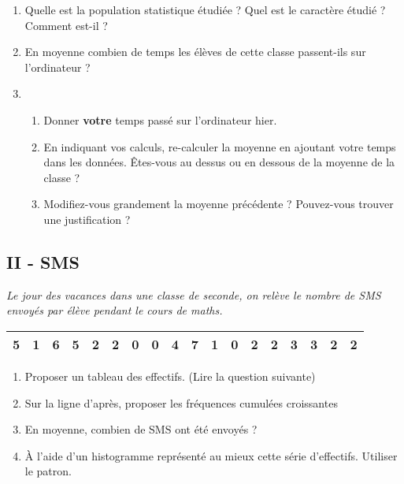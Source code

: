 \documentclass[11pt]{article}
\begin{document}
\begin{multicols}{2}
  \begin{enumerate}
  \item[1.] Quelle est la population statistique étudiée ? Quel est le caractère étudié ? Comment est-il ?
  \item[2.] En moyenne combien de temps les élèves de cette classe passent-ils sur l'ordinateur ?
  \item[3.]
    \begin{enumerate}
    \item[a)] Donner \textbf{votre} temps passé sur l'ordinateur hier.
    \item[b)] En indiquant vos calculs, re-calculer la moyenne en ajoutant votre temps dans les données. Êtes-vous au dessus ou en dessous de la moyenne de la classe ?
    \item[c)] Modifiez-vous grandement la moyenne précédente ? Pouvez-vous trouver une justification ?
    \end{enumerate}
  \end{enumerate}
\end{multicols}

\subsection*{II - SMS}

\textit{Le jour des vacances dans une classe de seconde, on relève le nombre de SMS envoyés par élève pendant le cours de maths.}

\begin{center}
  \begin{tabular}{| c | c | c | c | c | c | c | c | c | c | c | c | c | c | c | c | c | c | }
    \hline
    5 & 1 & 6 & 5 & 2 & 2 & 0 & 0 & 4 & 7 & 1 & 0 & 2 & 2 & 3 & 3 & 2 & 2 \\
    \hline
  \end{tabular}
\end{center}

\begin{multicols}{2}
  \begin{enumerate}
  \item[1.] Proposer un tableau des effectifs. (Lire la question suivante)
  \item[2.] Sur la ligne d'après, proposer les fréquences cumulées croissantes
  \item[3.] En moyenne, combien de SMS ont été envoyés ? 
  \item[4.] À l'aide d'un histogramme représenté au mieux cette série d'effectifs. Utiliser le patron.
  \end{enumerate}
\end{multicols}
\end{document}
